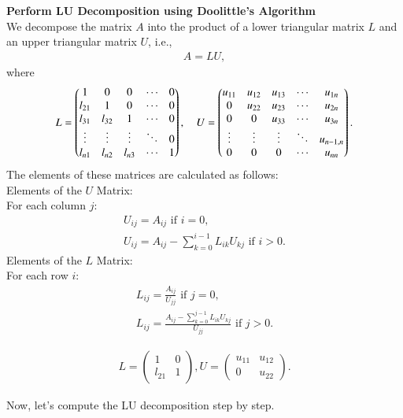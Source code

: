 \documentclass[journal]{IEEEtran}
\begin{document}
\textbf{Perform LU Decomposition using Doolittle's Algorithm} \\ 
We decompose the matrix $A$ into the product of a lower triangular matrix $L$ and an upper triangular matrix $U$, i.e.,  
\begin{align}  
A = LU,  
\end{align}  
where  
\begin{align}
	L = \begin{pmatrix}1 & 0 & 0 & \cdots & 0 \\ l_{21} & 1 & 0 & \cdots & 0 \\ l_{31} & l_{32} & 1 & \cdots & 0 \\ \vdots & \vdots & \vdots & \ddots & 0 \\ l_{n1} & l_{n2} & l_{n3} & \cdots & 1\end{pmatrix},\quad
	U = \begin{pmatrix}u_{11} & u_{12} & u_{13} & \cdots & u_{1n} \\ 0 & u_{22} & u_{23} & \cdots & u_{2n} \\ 0 & 0 & u_{33} & \cdots & u_{3n} \\ \vdots & \vdots & \vdots & \ddots & u_{n-1,n} \\ 0 & 0 & 0 & \cdots & u_{nn}\end{pmatrix}.
\end{align}
 The elements of these matrices are calculated as follows: \\  
Elements of the $U$ Matrix: \\  
For each column $j$:  
\begin{align}  
U_{ij} = A_{ij} \text{ if } i = 0, \\  
U_{ij} = A_{ij} - \sum_{k=0}^{i-1} L_{ik} U_{kj} \text{ if } i > 0.  
\end{align}  
Elements of the $L$ Matrix: \\  
For each row $i$:  
\begin{align}  
L_{ij} = \frac{A_{ij}}{U_{jj}} \text{ if } j = 0, \\  
L_{ij} = \frac{A_{ij} - \sum_{k=0}^{j-1} L_{ik} U_{kj}}{U_{jj}} \text{ if } j > 0.  
\end{align}  

\begin{align}  
L = \begin{pmatrix} 1 & 0 \\ l_{21} & 1 \end{pmatrix}, U = \begin{pmatrix} u_{11} & u_{12} \\ 0 & u_{22} \end{pmatrix}.  
\end{align}

Now, let's compute the LU decomposition step by step.  
\end{document}
